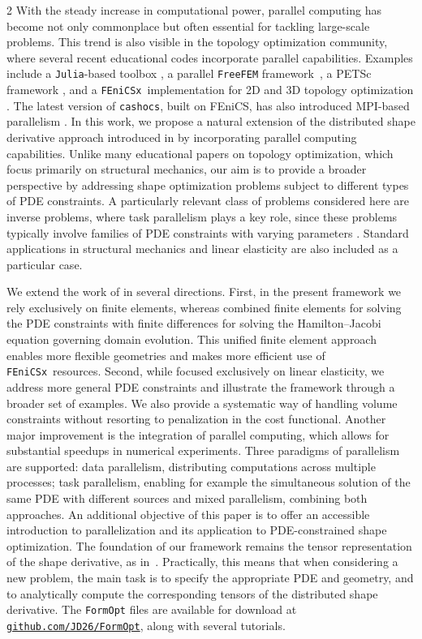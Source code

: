 \documentclass[a4paper, oneside]{article}
\newcommand{\fopt}{\texttt{FormOpt} }
\newcommand{\fx}{\texttt{FEniCSx}}
\begin{document}
\begin{multicols}{2}
With the steady increase in computational power, parallel computing has become not only commonplace but often essential for tackling large-scale problems. 
This trend is also visible in the topology optimization community, where several recent educational codes incorporate parallel capabilities. 
Examples include a \texttt{Julia}-based toolbox \cite{Wegert2025}, a parallel \texttt{FreeFEM} framework~\cite{MR4916810}, a PETSc  framework \cite{Aage2014}, and a \fx\ implementation for 2D and 3D topology optimization \cite{Jia2024}. The latest version of \texttt{cashocs}, built on FEniCS, has also introduced MPI-based parallelism \cite{BLAUTH2021100646,BLAUTH2023101577}.
In this work, we propose a natural extension of the distributed shape derivative approach introduced in \cite{MR3843884} by incorporating parallel computing capabilities.
Unlike many educational papers on topology optimization, which focus primarily on structural mechanics, our aim is to provide a broader perspective by addressing shape optimization problems subject to different types of PDE constraints.
A particularly relevant class of problems considered here are inverse problems, where task parallelism plays a key role, since these problems typically involve families of PDE constraints with varying parameters \cite{MR4261115}. Standard applications in  structural mechanics and linear elasticity are also included as a particular case.

We extend the work of \cite{MR3843884} in several directions. 
First, in the present framework we rely exclusively on finite elements, whereas \cite{MR3843884} combined finite elements for solving the PDE constraints with finite differences for solving the Hamilton–Jacobi equation governing domain evolution. This unified finite element approach enables more flexible geometries and makes more efficient use of \fx\ resources.
Second, while \cite{MR3843884} focused exclusively on linear elasticity, we address more general PDE constraints and illustrate the framework through a broader set of examples. 
We also provide a systematic way of handling volume constraints without resorting to penalization in the cost functional.
Another major improvement is the integration of parallel computing, which allows for substantial speedups in numerical experiments. 
Three paradigms of parallelism are supported: data parallelism, distributing computations across multiple processes; task parallelism, enabling for example the simultaneous solution of the same PDE with different sources and mixed parallelism, combining both approaches.
An additional objective of this paper is to offer an accessible introduction to parallelization and its application to PDE-constrained shape optimization.
The foundation of our framework remains the tensor representation of the shape derivative, as in~\cite{MR3843884}. Practically, this means that when considering a new problem, the main task is to specify the appropriate PDE and geometry, and to analytically compute the corresponding tensors of the distributed shape derivative.
The \fopt files are available for download at 
\href{https://github.com/JD26/FormOpt}{\texttt{github.com/JD26/FormOpt}}, 
along with several tutorials.


\end{multicols}
\end{document}
